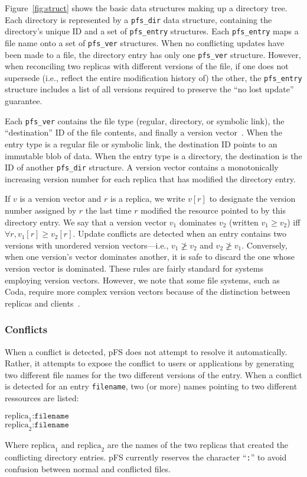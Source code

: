 Figure~\ref{fig:struct} shows the basic data structures making up a
directory tree.  Each directory is represented by a \texttt{pfs\_dir}
data structure, containing the directory's unique ID and a set of
\texttt{pfs\_entry} structures.  Each \texttt{pfs\_entry} maps a file
name onto a set of \texttt{pfs\_ver} structures.  When no conflicting
updates have been made to a file, the directory entry has only one
\texttt{pfs\_ver} structure.  However, when reconciling two replicas
with different versions of the file, if one does not supersede
(i.e., reflect the entire modification history of) the other, the
\texttt{pfs\_entry} structure includes a list of all versions required
to preserve the ``no lost update'' guarantee.

Each \texttt{pfs\_ver} contains the file type (regular, directory, or
symbolic link), the ``destination'' ID of the file contents, and
finally a version vector~\cite{parker:inconsistency}.  When the entry
type is a regular file or symbolic link, the destination ID points to
an immutable blob of data.  When the entry type is a directory, the
destination is the ID of another \texttt{pfs\_dir} structure.  A
version vector contains a monotonically increasing version number for
each replica that has modified the directory entry.

If $v$ is a version vector and $r$ is a replica, we write $v[r]$ to
designate the version number assigned by $r$ the last time $r$
modified the resource pointed to by this directory entry.  We say that
a version vector $v_1$ dominates $v_2$ (written $v_1\ge v_2$) iff
$\forall r, v_1[r]\ge v_2[r]$.  Update conflicts are detected when an
entry contains two versions with unordered version vectors---i.e.,
$v_1\not\ge v_2$ and $v_2\not\ge v_1$.  Conversely, when one version's
vector dominates another, it is safe to discard the one whose version
vector is dominated.  These rules are fairly standard for systems
employing version vectors.  However, we note that some file systems,
such as Coda, require more complex version vectors because of the
distinction between replicas and clients~\cite{satyanarayanan:coda}.

\subsubsection{Conflicts}

When a conflict is detected, pFS does not attempt to resolve it
automatically.  Rather, it attempts to expose the conflict to users or
applications by generating two different file names for the two
different versions of the entry. When a conflict is detected for an
entry \texttt{filename}, two (or more) names pointing to two different
ressources are listed:
\begin{center}
{\tt $\mathrm{replica}_1\texttt{:filename}$} \\
{\tt $\mathrm{replica}_2\texttt{:filename}$} \\
\end{center}
Where $\mathrm{replica}_1$ and $\mathrm{replica}_2$ are the names of
the two replicas that created the conflicting directory entries.  pFS
currently reserves the character ``\texttt{:}'' to avoid confusion
between normal and conflicted files.

